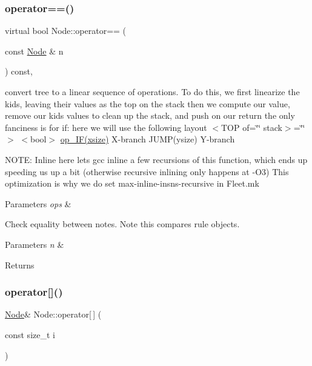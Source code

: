 \subsubsection{\texorpdfstring{operator==()}{operator==()}}
{\footnotesize\ttfamily virtual bool Node\+::operator== (\begin{DoxyParamCaption}\item[{const \hyperlink{class_node}{Node} \&}]{n }\end{DoxyParamCaption}) const\hspace{0.3cm}{\ttfamily [inline]}, {\ttfamily [virtual]}}



convert tree to a linear sequence of operations. To do this, we first linearize the kids, leaving their values as the top on the stack then we compute our value, remove our kids\textquotesingle{} values to clean up the stack, and push on our return the only fanciness is for if\+: here we will use the following layout $<$\+T\+O\+P of=\char`\"{}\char`\"{} stack$>$=\char`\"{}\char`\"{}$>$ $<$bool$>$ \hyperlink{_instruction_8h_af2fb7c87c5854c5733d7bb0506b06de7a8f69a9fe993189d72cf7b07e8517801d}{op\+\_\+\+I\+F(xsize)} X-\/branch J\+U\+M\+P(ysize) Y-\/branch 

N\+O\+TE\+: Inline here lets gcc inline a few recursions of this function, which ends up speeding us up a bit (otherwise recursive inlining only happens at -\/\+O3) This optimization is why we do set max-\/inline-\/insns-\/recursive in Fleet.\+mk 
\begin{DoxyParams}{Parameters}
{\em ops} & \\
\hline
\end{DoxyParams}
Check equality between notes. Note this compares rule objects. 
\begin{DoxyParams}{Parameters}
{\em n} & \\
\hline
\end{DoxyParams}
\begin{DoxyReturn}{Returns}

\end{DoxyReturn}
\mbox{\label{class_node_a0b89084e2c7416379edb7c537edcc8f2}} 
\subsubsection{\texorpdfstring{operator[]()}{operator[]()}\hspace{0.1cm}{\footnotesize\ttfamily [1/2]}}
{\footnotesize\ttfamily \hyperlink{class_node}{Node}\& Node\+::operator\mbox{[}$\,$\mbox{]} (\begin{DoxyParamCaption}\item[{const size\+\_\+t}]{i }\end{DoxyParamCaption})\hspace{0.3cm}{\ttfamily [inline]}}

